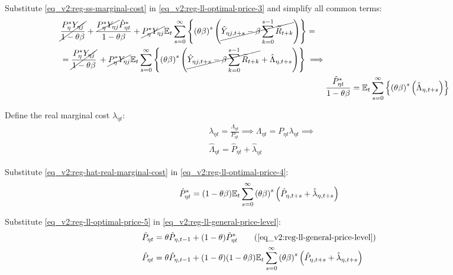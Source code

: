 \documentclass[../thesis.tex]{subfiles}
\begin{document}
Substitute \ref{eq_v2:reg-ss-marginal-cost} in \ref{eq_v2:reg-ll-optimal-price-3} and simplify all common terms:
\begin{align}
	\begin{split}
		& \cancel{\frac{P_{\eta}^{\ast} Y_{\eta j}}{1-\theta\beta}} + \frac{ \cancel{P_{\eta}^{\ast} Y_{\eta j}} \hat{P}_{\eta t}^{\ast}}{1- \theta \beta} + \cancel{P_{\eta}^{\ast} Y_{\eta j}} {\mathbb{E}_{t}} \sum_{s=0}^{\infty} \left\{ \left( \theta \beta \right)^s \left( \cancel{\hat{Y}_{\eta j, t+s} - \beta \sum_{k=0}^{s-1} \widetilde{R}_{t+k}} \right) \right\} = 
		\\
		& = \cancel{\frac{P_{\eta}^{\ast} Y_{\eta j}}{1-\theta\beta}} \, + \cancel{P_{\eta}^{\ast} Y_{\eta j}} {\mathbb{E}_{t}} \sum_{s=0}^{\infty} \left\{ \left( \theta \beta \right)^s \left( \cancel{\hat{Y}_{\eta j, t+s} - \beta \sum_{k=0}^{s-1} \widetilde{R}_{t+k}} + \hat{\Lambda}_{\eta, t+s} \right) \right\} \implies	
	\end{split} \nonumber \\
	& \frac{ \hat{P}_{\eta t}^{\ast}}{1- \theta \beta} = {\mathbb{E}_{t}} \sum_{s=0}^{\infty} \left\{ \left( \theta \beta \right)^s \left( \hat{\Lambda}_{\eta, t+s} \right) \right\} \label{eq_v2:reg-ll-optimal-price-4}
\end{align}



Define the real marginal cost $\lambda_{\eta t}$:
\begin{align}
	& \lambda_{\eta t} = \frac{\Lambda_{\eta t}}{P_{\eta t}} \implies \Lambda_{\eta t} = P_{\eta t} \lambda_{\eta t} \implies \nonumber \\
	& \hat{\Lambda}_{\eta t} = \hat{P}_{\eta t} + \hat{\lambda}_{\eta t} \label{eq_v2:reg-hat-real-marginal-cost}
\end{align}

Substitute \ref{eq_v2:reg-hat-real-marginal-cost} in \ref{eq_v2:reg-ll-optimal-price-4}:
\begin{align}
	\hat{P}_{\eta t}^{\ast} = (1- \theta \beta) {\mathbb{E}_{t}} \sum_{s=0}^{\infty} \left( \theta \beta \right)^s \left( \hat{P}_{\eta, t+s} + \hat{\lambda}_{\eta, t+s} \right) \label{eq_v2:reg-ll-optimal-price-5}
\end{align}

Substitute \ref{eq_v2:reg-ll-optimal-price-5} in \ref{eq_v2:reg-ll-general-price-level}:
\begin{align}
	\hat{P}_{\eta t} &= \theta \hat{P}_{\eta, t-1} + (1-\theta) \hat{P}_{\eta t}^{\ast} \tag{\ref{eq_v2:reg-ll-general-price-level}}\\
	\hat{P}_{\eta t} &= \theta \hat{P}_{\eta, t-1} + (1-\theta) (1- \theta \beta) \E \sum_{s=0}^{\infty} \left( \theta \beta \right)^s \left( \hat{P}_{\eta, t+s} + \hat{\lambda}_{\eta, t+s} \right) \label{eq_v2:reg-ll-general-price-level-2}
\end{align}
\end{document}
